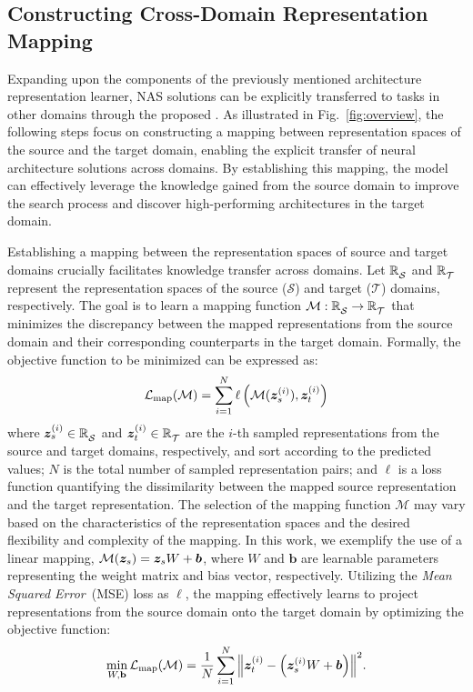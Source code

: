 \documentclass[../main.tex]{subfiles}
\begin{document}
\subsection{Constructing Cross-Domain Representation Mapping}

Expanding upon the components of the previously mentioned architecture representation learner, NAS solutions can be explicitly transferred to tasks in other domains through the proposed \OUR{}.
As illustrated in Fig.~\ref{fig:overview}, the following steps focus on constructing a mapping between representation spaces of the source and the target domain, enabling the explicit transfer of neural architecture solutions across domains.
By establishing this mapping, the model can effectively leverage the knowledge gained from the source domain to improve the search process and discover high-performing architectures in the target domain.


Establishing a mapping between the representation spaces of source and target domains crucially facilitates knowledge transfer across domains.
Let \( \mathbb{R}^{\mathstrut}_{\mathcal{S}} \) and \( \mathbb{R}^{\mathstrut}_{\mathcal{T}} \) represent the representation spaces of the source (\( \mathcal{S} \)) and target (\( \mathcal{T} \)) domains, respectively.
The goal is to learn a mapping function \( \mathcal{M}: \mathbb{R}^{\mathstrut}_{\mathcal{S}} \rightarrow \mathbb{R}^{\mathstrut}_\mathcal{T} \) that minimizes the discrepancy between the mapped representations from the source domain and their corresponding counterparts in the target domain.
Formally, the objective function to be minimized can be expressed as:
\begin{equation}
  \mathcal{L}_\mathrm{map}(\mathcal{M}) = \sum_{i=1}^{N}{\ell\left(\mathcal{M}(\bm{z}_{s}^{(i)}),\bm{z}_{t}^{(i)}\right)}
\end{equation}
where \( \bm{z}^{(i)}_{s} \in \mathbb{R}^{\mathstrut}_{\mathcal{S}} \) and \( \bm{z}^{(i)}_{t} \in \mathbb{R}^{\mathstrut}_{\mathcal{T}} \) are the \( i \)-th sampled representations from the source and target domains, respectively, and sort according to the predicted values; \( N \) is the total number of sampled representation pairs; and \( \ell \) is a loss function quantifying the dissimilarity between the mapped source representation and the target representation.
The selection of the mapping function \( \mathcal{M} \) may vary based on the characteristics of the representation spaces and the desired flexibility and complexity of the mapping.
In this work, we exemplify the use of a linear mapping, \( \mathcal{M}(\bm{z}_{s}) = \bm{z}_{s}W + \bm{b} \), where \( W \) and \( \bm{b} \) are learnable parameters representing the weight matrix and bias vector, respectively.
Utilizing the \textit{Mean Squared Error}~(MSE) loss as \( \ell \), the mapping effectively learns to project representations from the source domain onto the target domain by optimizing the objective function:
\begin{equation}
  \min_{W,\mathbf{b}} \mathcal{L}_\mathrm{map}(\mathcal{M}) = \frac{1}{N}\sum_{i=1}^{N}{\left\|\bm{z}_{t}^{(i)} - \left(\bm{z}_{s}^{(i)}W + \bm{b}\right)\right\|}^{2}.
\end{equation}
\end{document}

